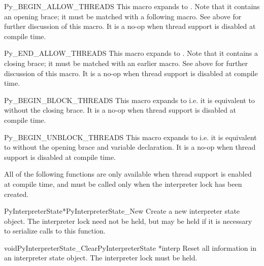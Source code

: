 \documentclass{manual}
\begin{document}
\begin{ctypedesc}{Py_BEGIN_ALLOW_THREADS}
This macro expands to
.
Note that it contains an opening brace; it must be matched with a
following  macro.  See above for further
discussion of this macro.  It is a no-op when thread support is
disabled at compile time.
\end{ctypedesc}

\begin{ctypedesc}{Py_END_ALLOW_THREADS}
This macro expands to
.
Note that it contains a closing brace; it must be matched with an
earlier  macro.  See above for further
discussion of this macro.  It is a no-op when thread support is
disabled at compile time.
\end{ctypedesc}

\begin{ctypedesc}{Py_BEGIN_BLOCK_THREADS}
This macro expands to  i.e. it
is equivalent to  without the closing
brace.  It is a no-op when thread support is disabled at compile
time.
\end{ctypedesc}

\begin{ctypedesc}{Py_BEGIN_UNBLOCK_THREADS}
This macro expands to  i.e. it is
equivalent to  without the opening brace
and variable declaration.  It is a no-op when thread support is
disabled at compile time.
\end{ctypedesc}

All of the following functions are only available when thread support
is enabled at compile time, and must be called only when the
interpreter lock has been created.

\begin{cfuncdesc}{PyInterpreterState*}{PyInterpreterState_New}{}
Create a new interpreter state object.  The interpreter lock need not
be held, but may be held if it is necessary to serialize calls to this
function.
\end{cfuncdesc}

\begin{cfuncdesc}{void}{PyInterpreterState_Clear}{PyInterpreterState *interp}
Reset all information in an interpreter state object.  The interpreter
lock must be held.
\end{cfuncdesc}
\end{document}
